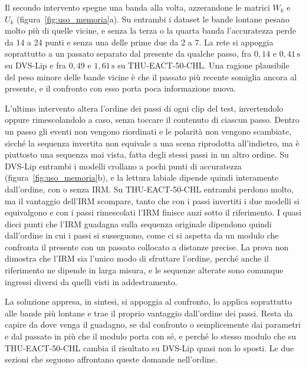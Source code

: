 Il secondo intervento spegne una banda alla volta, azzerandone le matrici $W_k$ e $U_k$ (figura~\ref{fig:uso_memoria}a). Su entrambi i dataset le bande lontane pesano molto più di quelle vicine, e senza la terza o la quarta banda l'accuratezza perde da 14 a 24 punti e senza una delle prime due da 2 a 7. La rete si appoggia soprattutto a un passato separato dal presente da qualche passo, fra $0{,}14$ e $0{,}41\,\mathrm{s}$ su DVS-Lip e fra $0{,}49$ e $1{,}61\,\mathrm{s}$ su THU-EACT-50-CHL. Una ragione plausibile del peso minore delle bande vicine è che il passato più recente somiglia ancora al presente, e il confronto con esso porta poca informazione nuova.

L'ultimo intervento altera l'ordine dei passi di ogni clip del test, invertendolo oppure rimescolandolo a caso, senza toccare il contenuto di ciascun passo. Dentro un passo gli eventi non vengono riordinati e le polarità non vengono scambiate, sicché la sequenza invertita non equivale a una scena riprodotta all'indietro, ma è piuttosto una sequenza mai vista, fatta degli stessi passi in un altro ordine. Su DVS-Lip entrambi i modelli crollano a pochi punti di accuratezza (figura~\ref{fig:uso_memoria}b), e la lettura labiale dipende quindi interamente dall'ordine, con o senza IRM. Su THU-EACT-50-CHL entrambi perdono molto, ma il vantaggio dell'IRM scompare, tanto che con i passi invertiti i due modelli si equivalgono e con i passi rimescolati l'IRM finisce anzi sotto il riferimento. I quasi dieci punti che l'IRM guadagna sulla sequenza originale dipendono quindi dall'ordine in cui i passi si susseguono, come ci si aspetta da un modulo che confronta il presente con un passato collocato a distanze precise. La prova non dimostra che l'IRM sia l'unico modo di sfruttare l'ordine, perché anche il riferimento ne dipende in larga misura, e le sequenze alterate sono comunque ingressi diversi da quelli visti in addestramento.

La soluzione appresa, in sintesi, si appoggia al confronto, lo applica soprattutto alle bande più lontane e trae il proprio vantaggio dall'ordine dei passi. Resta da capire da dove venga il guadagno, se dal confronto o semplicemente dai parametri e dal passato in più che il modulo porta con sé, e perché lo stesso modulo che su THU-EACT-50-CHL cambia il risultato su DVS-Lip quasi non lo sposti. Le due sezioni che seguono affrontano queste domande nell'ordine.


